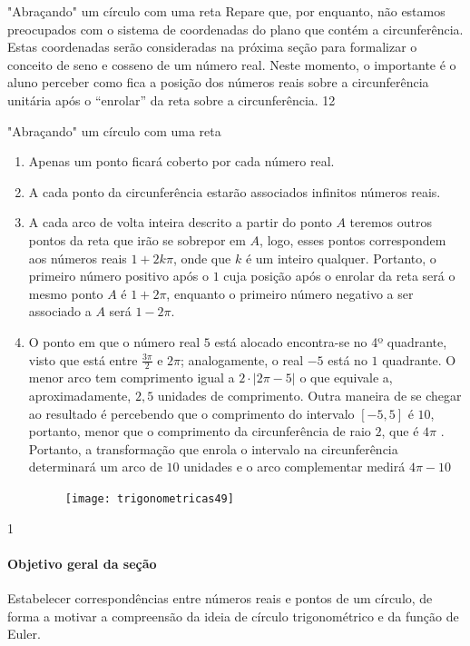 \begin{sugestions}{"Abraçando"{} um círculo com uma reta}
{
Repare que, por enquanto, não estamos preocupados com o sistema de coordenadas do plano que contém a circunferência. Estas coordenadas serão consideradas na próxima seção para formalizar o conceito de seno e cosseno de um número real. Neste momento, o importante é o aluno perceber como fica a posição dos números reais sobre a circunferência unitária após o “enrolar”{} da reta sobre a circunferência.
}{1}{2}
\end{sugestions}
\clearmargin
\begin{answer}{"Abraçando"{} um círculo com uma reta}
{
\begin{enumerate}
\item Apenas um ponto ficará coberto por cada número real.
\item A cada ponto da circunferência estarão associados infinitos números reais.
\item A cada arco de volta inteira descrito a partir do ponto $A$ teremos outros pontos da reta que irão se sobrepor em $A$, logo, esses pontos correspondem aos números reais $1 + 2k\pi$, onde que $k$ é um inteiro qualquer. Portanto, o primeiro número positivo após o $1$ cuja posição após o enrolar da reta será o mesmo ponto $A$ é $1 + 2\pi$, enquanto o primeiro número negativo a ser associado a $A$ será $1 - 2\pi$.
\item O ponto em que o número real $5$ está alocado encontra-se no 4º quadrante, visto que está entre $\frac{3\pi}{2}$ e $2\pi$; analogamente, o real $-5$ está no $1$ quadrante. O menor arco tem comprimento igual a $2\cdot|2\pi-5|$ o que equivale a, aproximadamente, $2{,}5$ unidades de comprimento. Outra maneira de se chegar ao resultado é percebendo que o comprimento do intervalo $[-5,5]$ é $10$, portanto, menor que o comprimento da circunferência de raio $2$, que é $4\pi$ . Portanto, a transformação que enrola o intervalo na circunferência determinará um arco de $10$ unidades e o arco complementar medirá $4\pi − 10$

\begin{figure}[H]
\centering

\texttt{[image: trigonometricas49]}
\end{figure}
\end{enumerate}
}{1}
\end{answer}
\def\currentcolor{session4}
\begin{texto}
{
	\paragraph{Objetivo geral da seção}
	Estabelecer correspondências entre números reais e pontos de um círculo, de forma a motivar a compreensão da ideia de círculo trigonométrico e da função de Euler.
}
\end{texto}
\label{trig-exp3}

